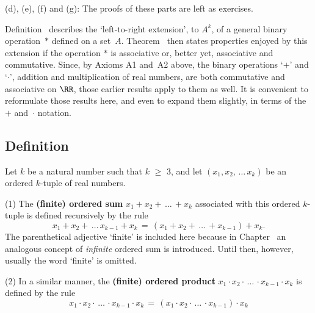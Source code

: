 \V

        (d), (e), (f) and (g): The proofs of these parts are left as exercises.

\V
\V

        Definition~ describes the `left-to-right extension', to $A^{k}$, of a general binary operation~${\ast}$ defined on a set~$A$.
    Theorem~ then states properties enjoyed by this extension if the operation ${\ast}$ is associative or, better yet, associative and commutative.
        Since, by Axioms A1 and~A2 above, the binary operations `$+$' and `${\cdot}$', addition and multiplication of real numbers,
    are both commutative and associative on ${\RR}$, those earlier results apply to them as well.
    It is convenient to reformulate those results here, and even to expand them slightly, in terms of the $+$ and~${\cdot}$ notation.

\VV

            \subsection{\small{\bf Definition}}
            \label{DefB10.30}

\V

        Let $k$ be a natural number such that $k\,\,{\geq}\,\,3$, and let $(x_{1}, x_{2},\,{\ldots}\,x_{k})$ be an ordered $k$-tuple of real numbers.

\V

        (1) The {\bf (finite) ordered sum} $x_{1} + x_{2} + \,{\ldots}\, + x_{k}$
    associated with this ordered $k$-tuple is defined recursively by the rule
        \begin{displaymath}
        x_{1} + x_{2} + \,{\ldots}\, x_{k-1} + x_{k} \,=\, (x_{1} + x_{2} + \,{\ldots}\, + x_{k-1}) + x_{k}.
        \end{displaymath}
    The parenthetical adjective `finite' is included here because in Chapter~
    an analogous concept of {\em infinite} ordered sum is introduced. Until then, however, usually the word `finite' is omitted.

\V

        (2) In a similar manner, the {\bf (finite) ordered product}
    $x_{1}{\cdot}x_{2}{\cdot}\,{\ldots}\,{\cdot}x_{k-1}{\cdot}x_{k}$ is defined by the rule
        \begin{displaymath}
        x_{1}{\cdot}x_{2}{\cdot}\,{\ldots}\,{\cdot}x_{k-1}{\cdot}x_{k}
     \,=\, 
        (x_{1}{\cdot}x_{2}{\cdot}\,{\ldots}\,{\cdot}x_{k-1}){\cdot}x_{k}
        \end{displaymath}

